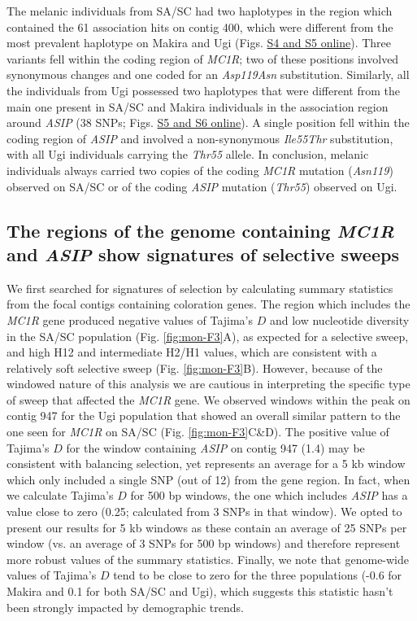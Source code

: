 The melanic individuals from \ac{SA/SC} had two haplotypes in the region which contained the 61 association hits on contig 400, which were different from the most prevalent haplotype on Makira and Ugi (Figs. \href{https://journals.plos.org/PLOSGENETICS/article?id=10.1371/journal.pgen.1010474#sec017}{S4 and S5 online}). Three variants fell within the coding region of \textit{MC1R}; two of these positions involved synonymous changes and one coded for an \textit{Asp119Asn} substitution. Similarly, all the individuals from Ugi possessed two haplotypes that were different from the main one present in \ac{SA/SC} and Makira individuals in the association region around \textit{ASIP} (38 \acsp{SNP}; Figs. \href{https://journals.plos.org/PLOSGENETICS/article?id=10.1371/journal.pgen.1010474#sec017}{S5 and S6 online}). A single position fell within the coding region of \textit{ASIP} and involved a non-synonymous \textit{Ile55Thr} substitution, with all Ugi individuals carrying the \textit{Thr55} allele. In conclusion, melanic individuals always carried two copies of the coding \textit{MC1R} mutation (\textit{Asn119}) observed on \ac{SA/SC} or of the coding \textit{ASIP} mutation (\textit{Thr55}) observed on Ugi.

\subsection{The regions of the genome containing \textit{MC1R} and \textit{ASIP} show signatures of selective sweeps}
We first searched for signatures of selection by calculating summary statistics from the focal contigs containing coloration genes. The region which includes the \textit{MC1R} gene produced negative values of Tajima’s $D$ and low nucleotide diversity in the \ac{SA/SC} population (Fig. \ref{fig:mon-F3}A), as expected for a selective sweep, and high H12 and intermediate H2/H1 values, which are consistent with a relatively soft selective sweep (Fig. \ref{fig:mon-F3}B). However, because of the windowed nature of this analysis we are cautious in interpreting the specific type of sweep that affected the \textit{MC1R} gene. We observed windows within the peak on contig 947 for the Ugi population that showed an overall similar pattern to the one seen for \textit{MC1R} on \ac{SA/SC} (Fig. \ref{fig:mon-F3}C\&D). The positive value of Tajima’s $D$ for the window containing \textit{ASIP} on contig 947 (1.4) may be consistent with balancing selection, yet represents an average for a 5 kb window which only included a single \acs{SNP} (out of 12) from the gene region. In fact, when we calculate Tajima’s $D$ for 500 bp windows, the one which includes \textit{ASIP} has a value close to zero (0.25; calculated from 3 \acsp{SNP} in that window). We opted to present our results for 5 kb windows as these contain an average of 25 \acsp{SNP} per window (vs. an average of 3 \acsp{SNP} for 500 bp windows) and therefore represent more robust values of the summary statistics. Finally, we note that genome-wide values of Tajima’s $D$ tend to be close to zero for the three populations (-0.6 for Makira and 0.1 for both \ac{SA/SC} and Ugi), which suggests this statistic hasn’t been strongly impacted by demographic trends.

